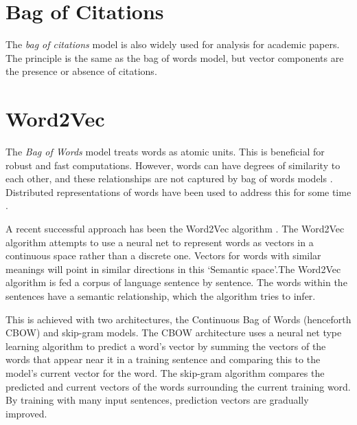\section{Bag of Citations}
The \emph{bag of citations} model is also widely used for analysis for academic papers. The principle is the same as the bag of words model, but vector components are the presence or absence of citations.  
\section{Word2Vec}
The \emph{Bag of Words} model treats words as atomic units. This is beneficial for robust and fast computations. However, words can have degrees of similarity to each other, and these relationships are not captured by bag of words models \cite{WORD2VECKINGQUEEN}. Distributed representations of words have been used to address this for some time \cite{olddistributed}.

 A recent successful approach has been the Word2Vec algorithm \cite{word2vec1} \cite{word2vec2}. The Word2Vec algorithm attempts to use a neural net to represent words as vectors in a continuous space rather than a discrete one. Vectors for words with similar meanings will point in similar directions in this `Semantic space'.The Word2Vec algorithm is fed a corpus of language sentence by sentence. The words within the sentences have a semantic relationship, which the algorithm tries to infer. 
 
This is achieved with two architectures, the Continuous Bag of Words (henceforth CBOW) and skip-gram models. The CBOW architecture uses a neural net type learning algorithm to predict a word's vector by summing the vectors of the words that appear near it in a training sentence and comparing this to the model's current vector for the word. The skip-gram algorithm compares the predicted and current vectors of the words surrounding the current training word. By training with many input sentences, prediction vectors are gradually improved. 

